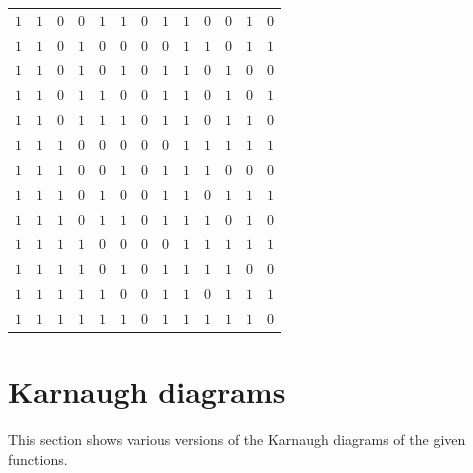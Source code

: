\documentclass [15pt,a4paper,twoside]{article}
\begin{document}
\begin{center}
\begin{tabular}{cccccc|ccccccc}
$1$&$1$&$0$&$0$&$1$&$1$&$0$&$1$&$1$&$0$&$0$&$1$&$0$\\
$1$&$1$&$0$&$1$&$0$&$0$&$0$&$0$&$1$&$1$&$0$&$1$&$1$\\
$1$&$1$&$0$&$1$&$0$&$1$&$0$&$1$&$1$&$0$&$1$&$0$&$0$\\
$1$&$1$&$0$&$1$&$1$&$0$&$0$&$1$&$1$&$0$&$1$&$0$&$1$\\
$1$&$1$&$0$&$1$&$1$&$1$&$0$&$1$&$1$&$0$&$1$&$1$&$0$\\
$1$&$1$&$1$&$0$&$0$&$0$&$0$&$0$&$1$&$1$&$1$&$1$&$1$\\
$1$&$1$&$1$&$0$&$0$&$1$&$0$&$1$&$1$&$1$&$0$&$0$&$0$\\
$1$&$1$&$1$&$0$&$1$&$0$&$0$&$1$&$1$&$0$&$1$&$1$&$1$\\
$1$&$1$&$1$&$0$&$1$&$1$&$0$&$1$&$1$&$1$&$0$&$1$&$0$\\
$1$&$1$&$1$&$1$&$0$&$0$&$0$&$0$&$1$&$1$&$1$&$1$&$1$\\
$1$&$1$&$1$&$1$&$0$&$1$&$0$&$1$&$1$&$1$&$1$&$0$&$0$\\
$1$&$1$&$1$&$1$&$1$&$0$&$0$&$1$&$1$&$0$&$1$&$1$&$1$\\
$1$&$1$&$1$&$1$&$1$&$1$&$0$&$1$&$1$&$1$&$1$&$1$&$0$\\

\end{tabular}
\end{center}
\section{Karnaugh diagrams}
This section shows various versions of the Karnaugh diagrams of the given functions.
\end{document}
